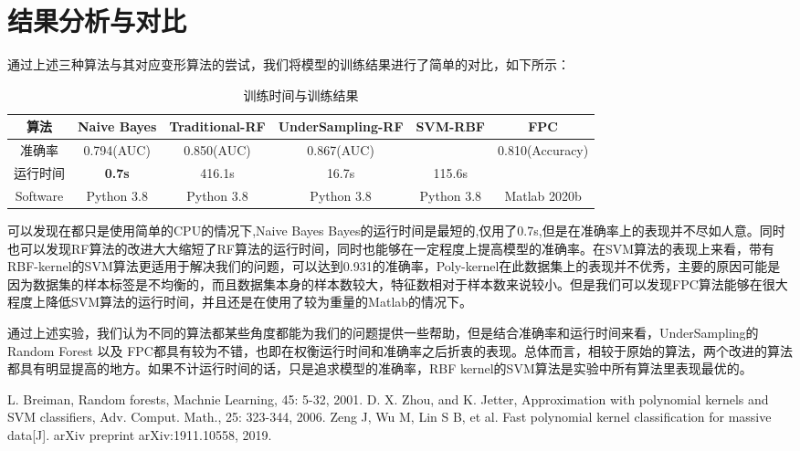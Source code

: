 \documentclass{zjureport}
\begin{document}
\section{结果分析与对比}
通过上述三种算法与其对应变形算法的尝试，我们将模型的训练结果进行了简单的对比，如下所示：
\begin{center}
\begin{table}[htbp]
\centering
  \caption{训练时间与训练结果}
  \label{tab:commands}
  \begin{tabular}{cccccc}
    \toprule
   算法 & Naive Bayes & Traditional-RF& UnderSampling-RF & SVM-RBF & FPC\\
    \midrule

准确率&	0.794(AUC) & 0.850(AUC) & 0.867(AUC)&{\color{blue}{0.931(Accuracy)}}&0.810(Accuracy)\\
运行时间&	\textbf{0.7s}& 416.1s & 16.7s & 115.6s & {\color{red}{5.49s}}\\
Software&Python 3.8 &Python 3.8&Python 3.8&Python 3.8&Matlab 2020b\\



    \bottomrule
  \end{tabular}
\end{table}
\end{center}  

可以发现在都只是使用简单的CPU的情况下,Naive Bayes Bayes的运行时间是最短的,仅用了0.7s,但是在准确率上的表现并不尽如人意。同时也可以发现RF算法的改进大大缩短了RF算法的运行时间，同时也能够在一定程度上提高模型的准确率。在SVM算法的表现上来看，带有RBF-kernel的SVM算法更适用于解决我们的问题，可以达到0.931的准确率，Poly-kernel在此数据集上的表现并不优秀，主要的原因可能是因为数据集的样本标签是不均衡的，而且数据集本身的样本数较大，特征数相对于样本数来说较小。但是我们可以发现FPC算法能够在很大程度上降低SVM算法的运行时间，并且还是在使用了较为重量的Matlab的情况下。

通过上述实验，我们认为不同的算法都某些角度都能为我们的问题提供一些帮助，但是结合准确率和运行时间来看，UnderSampling的Random Forest 以及 FPC都具有较为不错，也即在权衡运行时间和准确率之后折衷的表现。总体而言，相较于原始的算法，两个改进的算法都具有明显提高的地方。如果不计运行时间的话，只是追求模型的准确率，RBF kernel的SVM算法是实验中所有算法里表现最优的。

\begin{thebibliography}{99}  
L. Breiman, Random forests, Machnie Learning, 45: 5-32, 2001.
D. X. Zhou, and K. Jetter, Approximation with polynomial kernels and
SVM classifiers, Adv. Comput. Math., 25: 323-344, 2006.
Zeng J, Wu M, Lin S B, et al. Fast polynomial kernel classification for massive data[J]. arXiv preprint arXiv:1911.10558, 2019.
\end{thebibliography}
\end{document}
